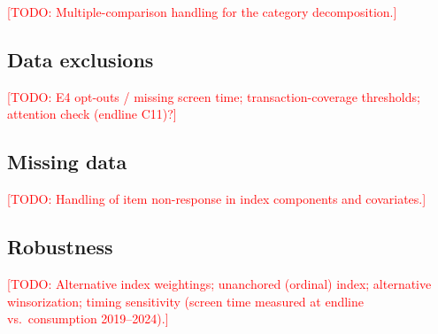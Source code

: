 \documentclass[11pt,a4paper]{article}
\newcommand{\todo}[1]{\textcolor{red}{[TODO: #1]}}
\begin{document}
\todo{Multiple-comparison handling for the category decomposition.}

\subsection{Data exclusions}
\todo{E4 opt-outs / missing screen time; transaction-coverage thresholds;
attention check (endline C11)?}

\subsection{Missing data}
\todo{Handling of item non-response in index components and covariates.}

\subsection{Robustness}
\todo{Alternative index weightings; unanchored (ordinal) index; alternative
winsorization; timing sensitivity (screen time measured at endline vs.\
consumption 2019--2024).}
\end{document}
